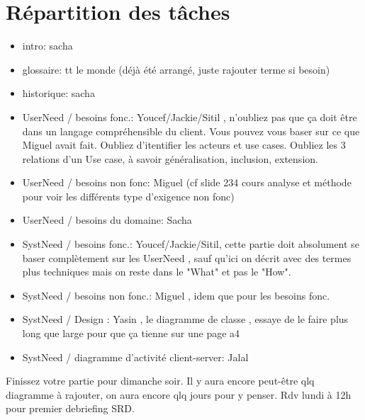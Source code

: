 \documentclass{article}
\begin{document}
\section{Répartition des tâches}
\begin{itemize}
\item intro: sacha
\item glossaire: tt le monde (déjà été arrangé, juste rajouter terme si besoin)
\item historique: sacha
\item UserNeed / besoins fonc.: Youcef/Jackie/Sitil , n'oubliez pas que ça doit être dans un langage compréhensible du client. Vous pouvez vous baser sur ce que Miguel avait fait. Oubliez d'itentifier les acteurs et use cases. Oubliez les 3 relations d'un Use case, à savoir généralisation, inclusion, extension.
\item UserNeed / besoins non fonc: Miguel (cf slide 234 cours analyse et méthode pour voir les différents type d'exigence non fonc)
\item UserNeed / besoins du domaine: Sacha
\item SystNeed / besoins fonc.: Youcef/Jackie/Sitil, cette partie doit absolument se baser complètement sur les UserNeed , sauf qu'ici on décrit avec des termes plus techniques mais on reste dans le "What" et pas le "How".
\item SystNeed / besoins non fonc.: Miguel , idem que pour les besoins fonc.
\item SystNeed / Design : Yasin , le diagramme de classe , essaye de le faire plus long que large pour que ça tienne sur une page a4 
\item SystNeed / diagramme d'activité client-server: Jalal
\end{itemize}
Finissez votre partie pour dimanche soir. Il y aura encore peut-être qlq diagramme à rajouter, on aura encore qlq jours pour y penser. Rdv lundi à 12h pour premier debriefing SRD.
\end{document}
